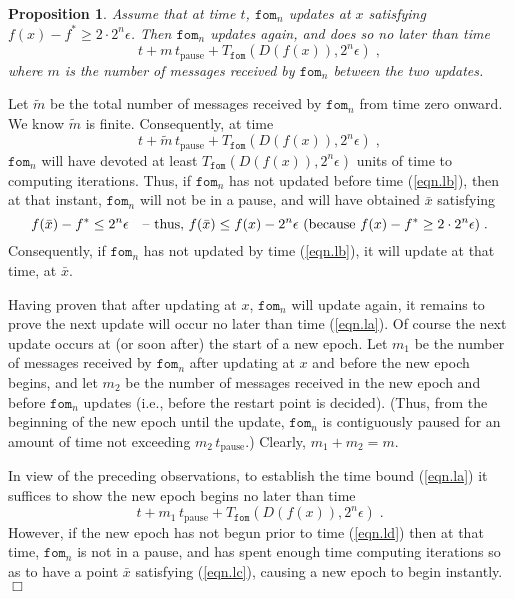 \documentclass[reqno, 11pt]{amsart}
\newtheorem{prop}{Proposition}[section]
\numberwithin{equation}{section}
\newcommand{\fom}{\mathtt{fom}}
\newcommand{\tpause}{t_{\mathrm{pause}}}
\begin{document}
\begin{prop}  \label{prop.la} 
Assume that at time $ t $, $ \fom_n $ updates at $ x $ satisfying $ f(x) - f^* \geq 2 \cdot 2^n \epsilon $. Then $ \fom_n $ updates again, and does so no later than time 
\begin{equation}  \label{eqn.la}
   t + m \, \tpause +  T_{\fom}( D(f(x)), 2^n \epsilon ) \; , 
 \end{equation}   
where $ m $ is the number of messages received by $ \fom_n $ between the two updates.
\end{prop}
  Let $ \widetilde{m} $ be the total number of messages received by $ \fom_n $ from time zero onward. We know $ \widetilde{m} $ is finite. Consequently, at time
\begin{equation}  \label{eqn.lb} 
   t + \widetilde{m}  \, \tpause +  T_{\fom}( D(f(x)), 2^n \epsilon ) \; ,
\end{equation}    
$ \fom_n $ will have devoted at least $  T_{\fom}( D(f(x)), 2^n \epsilon ) $ units of time to computing iterations.  Thus, if $ \fom_n $ has not updated before time (\ref{eqn.lb}), then at that instant, $ \fom_n $  will not be in a pause, and will have obtained $ \bar{x} $ satisfying  
\begin{equation}  \label{eqn.lc} 
 f( \bar{x}) - f^* \leq 2^n \epsilon \quad \textrm{-- thus, $ f(\bar{x}) \leq f(x) - 2^n \epsilon $ (because $ f(x) - f^* \geq 2 \cdot 2^n \epsilon $)} \; .   
 \end{equation}
Consequently, if $ \fom_n $ has not updated by time (\ref{eqn.lb}), it will update at that time, at $ \bar{x} $.

Having proven that after updating at $ x $, $ \fom_n $ will update again, it remains to prove the next update will occur no later than time (\ref{eqn.la}).   Of course the next update occurs at (or soon after) the start of a new epoch. Let $ m_1 $ be the number of messages received by $ \fom_n $ after updating at $ x $ and before the new epoch begins, and let $ m_2 $ be the number of messages received in the new epoch and before $ \fom_n $ updates (i.e., before the restart point is decided). (Thus, from the beginning of the new epoch until the update, $ \fom_n $ is contiguously paused for an amount of time not exceeding $ m_2 \, \tpause $.) Clearly, $ m_1 + m_2 = m $.  

In view of the preceding observations, to establish the time bound (\ref{eqn.la})  it suffices to show the new epoch begins no later than time
\begin{equation}  \label{eqn.ld} 
   t + m_1 \, \tpause + T_{\fom}( D(f(x)), 2^n \epsilon ) \; . 
 \end{equation}
However, if the new epoch has not begun prior to time (\ref{eqn.ld})  then at that time, $ \fom_n $ is not in a pause, and has spent enough time computing iterations so as to have a point $ \bar{x} $ satisfying (\ref{eqn.lc}), causing a new epoch to begin instantly. \hfill $ \Box $
 
\end{document}
